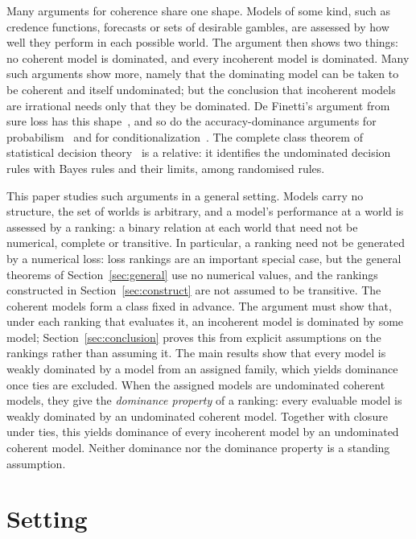 \documentclass[11pt]{article}
\theoremstyle{definition}
\begin{document}
Many arguments for coherence share one shape. Models of some kind, such as credence functions, forecasts or sets of desirable gambles, are assessed by how well they perform in each possible world. The argument then shows two things: no coherent model is dominated, and every incoherent model is dominated. Many such arguments show more, namely that the dominating model can be taken to be coherent and itself undominated; but the conclusion that incoherent models are irrational needs only that they be dominated. De Finetti's argument from sure loss has this shape~\cite{deFinetti}, and so do the accuracy-dominance arguments for probabilism~\cite{Joyce,Predd,SSK09,Pettigrew,Nielsen} and for conditionalization~\cite{BP20,Nielsen21}. The complete class theorem of statistical decision theory~\cite{Wald} is a relative: it identifies the undominated decision rules with Bayes rules and their limits, among randomised rules.

This paper studies such arguments in a general setting. Models carry no structure, the set of worlds is arbitrary, and a model's performance at a world is assessed by a ranking: a binary relation at each world that need not be numerical, complete or transitive. In particular, a ranking need not be generated by a numerical loss: loss rankings are an important special case, but the general theorems of Section~\ref{sec:general} use no numerical values, and the rankings constructed in Section~\ref{sec:construct} are not assumed to be transitive. The coherent models form a class fixed in advance. The argument must show that, under each ranking that evaluates it, an incoherent model is dominated by some model; Section~\ref{sec:conclusion} proves this from explicit assumptions on the rankings rather than assuming it. The main results show that every model is weakly dominated by a model from an assigned family, which yields dominance once ties are excluded. When the assigned models are undominated coherent models, they give the \emph{dominance property} of a ranking: every evaluable model is weakly dominated by an undominated coherent model. Together with closure under ties, this yields dominance of every incoherent model by an undominated coherent model. Neither dominance nor the dominance property is a standing assumption.




\newpage


\section{Setting}\label{sec:setting}
\end{document}
